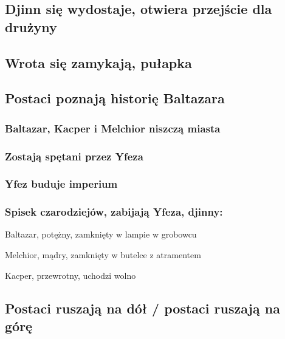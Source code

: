 \documentclass[11pt]{article}
\begin{document}
\subsection*{Djinn się wydostaje, otwiera przejście dla drużyny}
\label{sec-5.5}

\subsection*{Wrota się zamykają, pułapka}
\label{sec-5.6}

\subsection*{Postaci poznają historię Baltazara}
\label{sec-5.7}

\subsubsection*{Baltazar, Kacper i Melchior niszczą miasta}
\label{sec-5.7.1}

\subsubsection*{Zostają spętani przez Yfeza}
\label{sec-5.7.2}

\subsubsection*{Yfez buduje imperium}
\label{sec-5.7.3}

\subsubsection*{Spisek czarodziejów, zabijają Yfeza, djinny:}
\label{sec-5.7.4}

\begin{description}

\item[Baltazar, potężny, zamknięty w lampie w grobowcu]\label{sec-5.7.4.1}


\end{description}
\begin{description}

\item[Melchior, mądry, zamknięty w butelce z atramentem]\label{sec-5.7.4.2}


\end{description}
\begin{description}

\item[Kacper, przewrotny, uchodzi wolno]\label{sec-5.7.4.3}


\end{description}
\subsection*{Postaci ruszają na dół / postaci ruszają na górę}
\label{sec-5.8}
\end{document}
